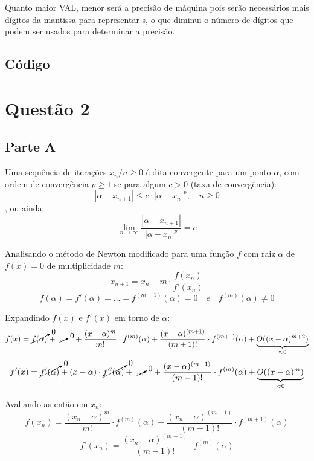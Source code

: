 \documentclass[12pt,a4paper,final]{article}
\begin{document}
Quanto maior VAL, menor será a precisão de máquina pois serão necessários
mais dígitos da mantissa para representar s, o que diminui o número
de dígitos que podem ser usados para determinar a precisão.

\subsection{Código}



\section{Questão 2}

\subsection{Parte A}


Uma sequência de iterações $ {x_n / n \geq 0} $ é dita convergente para um ponto $ \alpha $, com 
ordem de convergência $ p \geq 1 $ se para algum $ c > 0 $ (taxa de convergência):
\[ |\alpha - x_{n+1}| \leq c \cdot |\alpha - x_n|^p, \quad n \geq 0 \],
ou ainda:
\[ \lim_{n \to \infty} \frac{|\alpha - x_{n+1}|}{|\alpha - x_n|^p} = c \]

Analisando o método de Newton modificado para uma função $ f $ com raiz $ \alpha $ de $ f(x) = 0 $
de multiplicidade $ m $:
\[ x_{n+1} = x_n - m \cdot \frac{f(x_n)}{f'(x_n)} \]
\[ f(\alpha) = f'(\alpha) = ... = f^{(m-1)}(\alpha) = 0 \quad e \quad f^{(m)}(\alpha) \neq 0 \]

Expandindo $ f(x) $ e $ f'(x) $ em torno de $ \alpha $:
\[ f(x) = \cancelto{0}{f(\alpha)} + 
          \; \cancelto{0}{ ... } \quad + 
          \frac{(x - \alpha)^m}{m!} \cdot f^{(m)}(\alpha) + 
          \frac{(x - \alpha)^{(m+1)}}{(m+1)!} \cdot f^{(m+1)}(\alpha) + 
          \underbrace{O((x - \alpha)^{m+2})}_{\approx 0} \]
\[ f'(x) = \cancelto{0}{f'(\alpha)} + 
           (x - \alpha) \cdot \cancelto{0}{f''(\alpha)} + 
           \; \cancelto{0}{ ... } \quad + 
           \frac{(x - \alpha)^{(m-1)}}{(m-1)!} \cdot f^{(m)}(\alpha) + 
           \underbrace{O((x - \alpha)^{m})}_{\approx 0} \]

Avaliando-as então em $ x_n $:
\[ f(x_n) = \frac{(x_n - \alpha)^m}{m!} \cdot f^{(m)}(\alpha) + 
            \frac{(x_n - \alpha)^{(m+1)}}{(m+1)!} \cdot f^{(m+1)}(\alpha) \]
\[ f'(x_n) = \frac{(x_n - \alpha)^{(m-1)}}{(m-1)!} \cdot f^{(m)}(\alpha) \]
\end{document}
